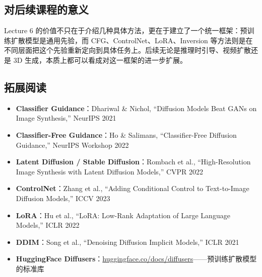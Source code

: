 \documentclass[a4paper]{article}
\begin{document}
\subsection{对后续课程的意义}

Lecture 6 的价值不只在于介绍几种具体方法，更在于建立了一个统一框架：预训练扩散模型是通用先验，而 CFG、ControlNet、LoRA、Inversion 等方法则是在不同层面把这个先验重新定向到具体任务上。后续无论是推理时引导、视频扩散还是 3D 生成，本质上都可以看成对这一框架的进一步扩展。

\subsection{拓展阅读}

\begin{itemize}
    \item \textbf{Classifier Guidance}：Dhariwal \& Nichol, ``Diffusion Models Beat GANs on Image Synthesis,'' NeurIPS 2021
    \item \textbf{Classifier-Free Guidance}：Ho \& Salimans, ``Classifier-Free Diffusion Guidance,'' NeurIPS Workshop 2022
    \item \textbf{Latent Diffusion / Stable Diffusion}：Rombach et al., ``High-Resolution Image Synthesis with Latent Diffusion Models,'' CVPR 2022
    \item \textbf{ControlNet}：Zhang et al., ``Adding Conditional Control to Text-to-Image Diffusion Models,'' ICCV 2023
    \item \textbf{LoRA}：Hu et al., ``LoRA: Low-Rank Adaptation of Large Language Models,'' ICLR 2022
    \item \textbf{DDIM}：Song et al., ``Denoising Diffusion Implicit Models,'' ICLR 2021
    \item \textbf{HuggingFace Diffusers}：\href{https://huggingface.co/docs/diffusers}{huggingface.co/docs/diffusers}——预训练扩散模型的标准库
\end{itemize}

\end{document}
